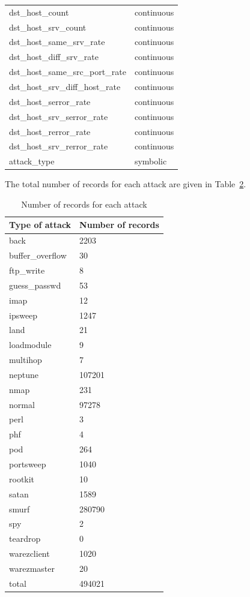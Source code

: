 \documentclass[11pt]{article}
\begin{document}
\begin{table}
\begin{tabular}{ll}
dst\_host\_count & continuous \\
dst\_host\_srv\_count & continuous \\
dst\_host\_same\_srv\_rate & continuous \\
dst\_host\_diff\_srv\_rate & continuous \\
dst\_host\_same\_src\_port\_rate & continuous \\
dst\_host\_srv\_diff\_host\_rate & continuous \\
dst\_host\_serror\_rate & continuous \\
dst\_host\_srv\_serror\_rate & continuous \\
dst\_host\_rerror\_rate & continuous \\
dst\_host\_srv\_rerror\_rate & continuous \\
attack\_type & symbolic \\
\end{tabular}
\label{Tab:allfeatures}
\end{table}

The total number of records for each attack are given in Table~\ref{Tab:numRecs}.
\begin{table}
\caption{Number of records for each attack}
\centering
\begin{tabular}{ll}
Type of attack & Number of records \\
\hline
back & 2203 \\
buffer\_overflow & 30 \\
ftp\_write & 8 \\
guess\_passwd & 53 \\
imap & 12 \\
ipsweep & 1247 \\
land & 21 \\
loadmodule &  9 \\
multihop & 7 \\
neptune &  107201 \\
nmap &  231 \\
normal &  97278 \\
perl &  3 \\
phf &  4 \\
pod &  264 \\
portsweep &  1040 \\
rootkit &  10 \\
satan &  1589 \\
smurf &  280790 \\
spy &  2 \\
teardrop &  0 \\
warezclient &  1020 \\
warezmaster &  20 \\
total & 494021 \\
\end{tabular}
\label{Tab:numRecs}
\end{table}
\end{document}
